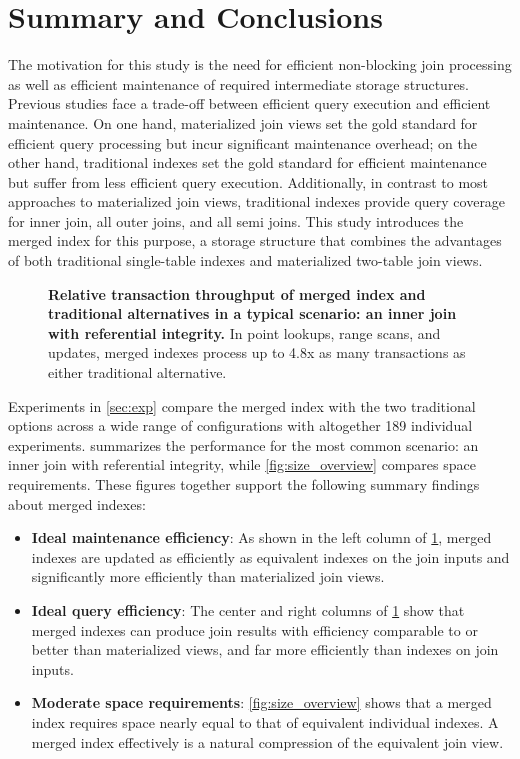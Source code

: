 \documentclass[biblatex, english]{lni}
\begin{document}
\section{Summary and Conclusions}\label{sec:sum}

The motivation for this study is the need for efficient non-blocking join processing as well as efficient maintenance of required intermediate storage structures.
Previous studies face a trade-off between efficient query execution and efficient maintenance.
On one hand, materialized join views set the gold standard for efficient query processing but incur significant maintenance overhead;
on the other hand, traditional indexes set the gold standard for efficient maintenance but suffer from less efficient query execution.
Additionally, in contrast to most approaches to materialized join views, traditional indexes provide query coverage for inner join, all outer joins, and all semi joins.
This study introduces the merged index for this purpose, a storage structure that combines the advantages of both traditional single-table indexes and materialized two-table join views.

\begin{figure}[htb]
    \caption{\textbf{Relative transaction throughput of merged index and traditional alternatives in a typical scenario: an inner join with referential integrity.}
        In point lookups, range scans, and updates, merged indexes process up to 4.8x as many transactions as either traditional alternative.} \label{fig:perf}
\end{figure}

Experiments in \cref{sec:exp} compare the merged index with the two traditional options across a wide range of configurations with altogether 189 individual experiments.
 summarizes the performance for the most common scenario: an inner join with referential integrity, while \cref{fig:size_overview} compares space requirements.
These figures together support the following summary findings about merged indexes:

\begin{itemize}
    \item \textbf{Ideal maintenance efficiency}: As shown in the left column of \cref{fig:perf}, merged indexes are updated as efficiently as equivalent indexes on the join inputs and significantly more efficiently than materialized join views.
    \item \textbf{Ideal query efficiency}: The center and right columns of \cref{fig:perf} show that merged indexes can produce join results with efficiency comparable to or better than materialized views, and far more efficiently than indexes on join inputs.
    \item \textbf{Moderate space requirements}: \cref{fig:size_overview} shows that a merged index requires space nearly equal to that of equivalent individual indexes. A merged index effectively is a natural compression of the equivalent join view.
\end{itemize}
\end{document}
